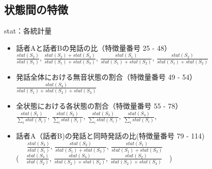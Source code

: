\documentclass[10pt]{jsarticle}
\begin{document}
\subsection{状態間の特徴}
stat：各統計量
\begin{itemize}
\item 話者Aと話者Bの発話の比（特徴量番号 25 - 48）\\
$\frac{stat(S_2)}{stat(S_1)}$, $\frac{stat(S_2)+stat(S_3)}{stat(S_1)+stat(S_3)}$, $\frac{stat(S_1)}{stat(S_1)+stat(S_2)}$, $\frac{stat(S_2)}{stat(S_1) + stat(S_2)}$
\item 発話全体における無音状態の割合（特徴量番号 49 - 54）\\
$\frac{stat(S_4)}{stat(S_1) + stat(S_2) + stat(S_3)}$
\item 全状態における各状態の割合（特徴量番号 55 - 78）\\
$\frac{stat(S_1)}{\sum_i{stat(S_i)}}$, $\frac{stat(S_2)}{\sum_i{stat(S_i)}}$, $\frac{stat(S_3)}{\sum_i{stat(S_i)}}$, $\frac{stat(S_4)}{\sum_i{stat(S_i)}}$, 
\item 話者A（話者B)の発話と同時発話の比(特徴量番号 79 - 114)\\
\ \ \ $\frac{stat(S_3)}{stat(S_1)}$, $\frac{stat(S_3)}{stat(S_1) + stat(S_3)}$, $\frac{stat(S_1)}{stat(S_1) + stat(S_3)}$\\
(\ \ $\frac{stat(S_3)}{stat(S_2)}$, $\frac{stat(S_3)}{stat(S_2) + stat(S_3)}$, $\frac{stat(S_2)}{stat(S_2) + stat(S_3)}$\ \ )
\end{itemize}
\end{document}

